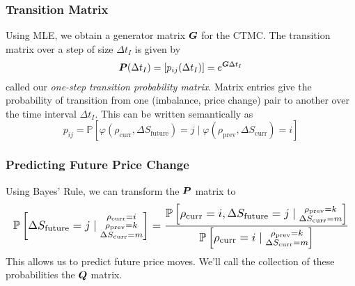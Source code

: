 \begin{frame}
\frametitle{Transition Matrix}
Using MLE, we obtain a generator matrix $\boldsymbol{G}$ for the CTMC. The transition matrix over a step of size $\Delta t_I$ is given by
\[ \boldsymbol{P}(\Delta t_I) = [p_{ij}(\Delta t_I)] = e^{\boldsymbol{G} \Delta t_I} \]
called our \emph{one-step transition probability matrix}. Matrix entries give the probability of transition from one (imbalance, price change) pair to another over the time interval $\Delta t_I$. This can be written semantically as
\[ p_{ij} = \mathbb{P}\left[ \varphi( \rho_\text{curr}, \Delta S_\text{future}) = j \; | \; \varphi( \rho_\text{prev}, \Delta S_\text{curr} ) = i \right] \]
\end{frame}

\begin{frame}
\frametitle{Predicting Future Price Change}
Using Bayes' Rule, we can transform the $\boldsymbol{P}$ matrix to 
\[
\resizebox{\textwidth}{!}{$\displaystyle
\mathbb{P}\left[ \Delta S_\text{future} = j \; | \; \substack{
\rho_\text{curr} = i \\
\rho_\text{prev} = k\\
\Delta S_\text{curr} = m} \right] = \dfrac{\mathbb{P}\left[ \rho_\text{curr} = i, \Delta S_\text{future} = j \; | \; \substack{
\rho_\text{prev} = k\\
\Delta S_\text{curr} = m} \right]}{\mathbb{P}\left[ \rho_\text{curr} = i \; | \; \substack{
\rho_\text{prev} = k\\
\Delta S_\text{curr} = m} \right]}
$}
\]
This allows us to predict future price moves.
\vspace{\baselineskip}
We'll call the collection of these probabilities the $\boldsymbol{Q}$ matrix.
\end{frame}

